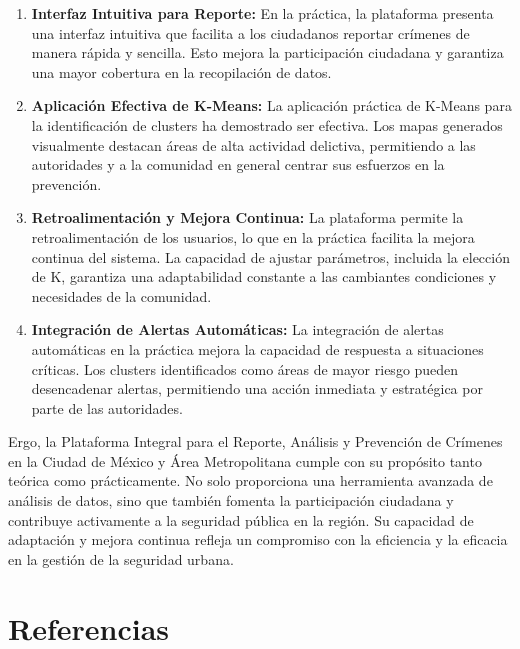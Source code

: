 \documentclass{article}
\begin{document}
        \begin{enumerate}[label=\arabic*.]
            \item \textbf{Interfaz Intuitiva para Reporte:}
            En la práctica, la plataforma presenta una interfaz intuitiva que facilita a los ciudadanos reportar crímenes de manera rápida y sencilla. Esto mejora la participación ciudadana y garantiza una mayor cobertura en la recopilación de datos.

            \item \textbf{Aplicación Efectiva de K-Means:}
            La aplicación práctica de K-Means para la identificación de clusters ha demostrado ser efectiva. Los mapas generados visualmente destacan áreas de alta actividad delictiva, permitiendo a las autoridades y a la comunidad en general centrar sus esfuerzos en la prevención.

            \item \textbf{Retroalimentación y Mejora Continua:}
            La plataforma permite la retroalimentación de los usuarios, lo que en la práctica facilita la mejora continua del sistema. La capacidad de ajustar parámetros, incluida la elección de K, garantiza una adaptabilidad constante a las cambiantes condiciones y necesidades de la comunidad.

            \item \textbf{Integración de Alertas Automáticas:}
            La integración de alertas automáticas en la práctica mejora la capacidad de respuesta a situaciones críticas. Los clusters identificados como áreas de mayor riesgo pueden desencadenar alertas, permitiendo una acción inmediata y estratégica por parte de las autoridades.
        \end{enumerate}

Ergo, la Plataforma Integral para el Reporte, Análisis y Prevención de Crímenes en la Ciudad de México y Área Metropolitana cumple con su propósito tanto teórica como prácticamente. No solo proporciona una herramienta avanzada de análisis de datos, sino que también fomenta la participación ciudadana y contribuye activamente a la seguridad pública en la región. Su capacidad de adaptación y mejora continua refleja un compromiso con la eficiencia y la eficacia en la gestión de la seguridad urbana.

\newpage
\section*{Referencias}
\end{document}
